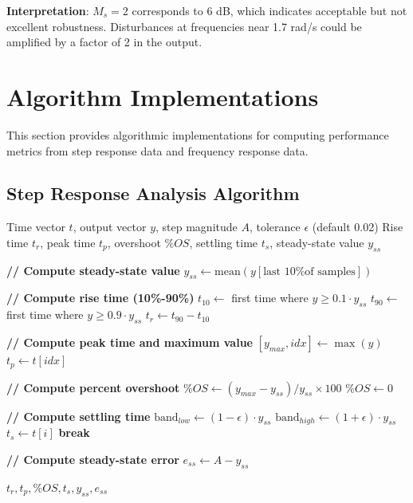 \textbf{Interpretation}: $M_s = 2$ corresponds to 6 dB, which indicates acceptable but not excellent robustness. Disturbances at frequencies near 1.7 rad/s could be amplified by a factor of 2 in the output.


\section{Algorithm Implementations}
\label{sec:algorithms}

This section provides algorithmic implementations for computing performance metrics from step response data and frequency response data.

\subsection{Step Response Analysis Algorithm}

\begin{algorithm}[htbp]
\caption{Compute Time-Domain Performance Metrics from Step Response}
\label{alg:step_response}
\begin{algorithmic}[1]
\REQUIRE Time vector $t$, output vector $y$, step magnitude $A$, tolerance $\epsilon$ (default 0.02)
\ENSURE Rise time $t_r$, peak time $t_p$, overshoot $\%OS$, settling time $t_s$, steady-state value $y_{ss}$

\STATE \textbf{// Compute steady-state value}
\STATE $y_{ss} \leftarrow \text{mean}(y[\text{last 10\% of samples}])$

\STATE \textbf{// Compute rise time (10\%-90\%)}
\STATE $t_{10} \leftarrow$ first time where $y \geq 0.1 \cdot y_{ss}$
\STATE $t_{90} \leftarrow$ first time where $y \geq 0.9 \cdot y_{ss}$
\STATE $t_r \leftarrow t_{90} - t_{10}$

\STATE \textbf{// Compute peak time and maximum value}
\STATE $[y_{max}, idx] \leftarrow \max(y)$
\STATE $t_p \leftarrow t[idx]$

\STATE \textbf{// Compute percent overshoot}
    \STATE $\%OS \leftarrow (y_{max} - y_{ss}) / y_{ss} \times 100$
\ELSE
    \STATE $\%OS \leftarrow 0$
\ENDIF

\STATE \textbf{// Compute settling time}
\STATE $\text{band}_{low} \leftarrow (1 - \epsilon) \cdot y_{ss}$
\STATE $\text{band}_{high} \leftarrow (1 + \epsilon) \cdot y_{ss}$
        \STATE $t_s \leftarrow t[i]$
        \STATE \textbf{break}
    \ENDIF
\ENDFOR

\STATE \textbf{// Compute steady-state error}
\STATE $e_{ss} \leftarrow A - y_{ss}$

\RETURN $t_r, t_p, \%OS, t_s, y_{ss}, e_{ss}$
\end{algorithmic}
\end{algorithm}

